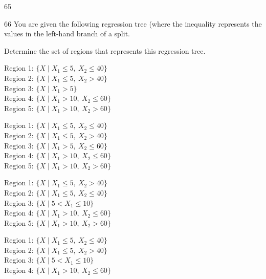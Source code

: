 \begin{question}{65}
\deleted
\end{question}

\begin{question}{66}
You are given the following regression tree (where the inequality represents the values in the left-hand branch of a split.


Determine the set of regions that represents this regression tree.

\begin{choices}
\item Region 1: $\{X \mid X_1 \leqslant 5,\ X_2 \leqslant 40\}$ \\
      Region 2: $\{X \mid X_1 \leqslant 5,\ X_2 > 40\}$ \\
      Region 3: $\{X \mid X_1 > 5\}$ \\
      Region 4: $\{X \mid X_1 > 10,\ X_2 \leqslant 60\}$ \\
      Region 5: $\{X \mid X_1 > 10,\ X_2 > 60\}$
\item Region 1: $\{X \mid X_1 \leqslant 5,\ X_2 \leqslant 40\}$ \\
      Region 2: $\{X \mid X_1 \leqslant 5,\ X_2 > 40\}$ \\
      Region 3: $\{X \mid X_1 > 5,\ X_2 \leqslant 60\}$ \\
      Region 4: $\{X \mid X_1 > 10,\ X_2 \leqslant 60\}$ \\
      Region 5: $\{X \mid X_1 > 10,\ X_2 > 60\}$
\item Region 1: $\{X \mid X_1 \leqslant 5,\ X_2 > 40\}$ \\
      Region 2: $\{X \mid X_1 \leqslant 5,\ X_2 \leqslant 40\}$ \\
      Region 3: $\{X \mid 5 < X_1 \leqslant 10\}$ \\
      Region 4: $\{X \mid X_1 > 10,\ X_2 \leqslant 60\}$ \\
      Region 5: $\{X \mid X_1 > 10,\ X_2 > 60\}$
\item Region 1: $\{X \mid X_1 \leqslant 5,\ X_2 \leqslant 40\}$ \\
      Region 2: $\{X \mid X_1 \leqslant 5,\ X_2 > 40\}$ \\
      Region 3: $\{X \mid 5 < X_1 \leqslant 10\}$ \\
      Region 4: $\{X \mid X_1 > 10,\ X_2 \leqslant 60\}$ \\

\end{choices}
\end{question}
